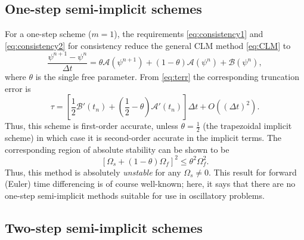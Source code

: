 \documentclass[12pt]{article}
\newcommand{\dt}{\Delta t}
\newcommand{\opA}{\mathcal{A}}
\newcommand{\opB}{\mathcal{B}}
\begin{document}
\pagebreak[3]
\subsection{One-step semi-implicit schemes}

For a one-step scheme ($m=1$), the requirements \eqref{eq:consistency1} and 
\eqref{eq:consistency2} for consistency reduce the general CLM method 
\eqref{eq:CLM} to
\begin{equation}
  \frac{\psi^{n+1}-\psi^{n}}{\dt} =
    \theta \opA(\psi^{n+1}) + (1-\theta) \opA(\psi^{n}) + \opB(\psi^{n}) ,
\end{equation}
where $\theta$ is the single free parameter.  
From \eqref{eq:terr} the corresponding truncation error is
\begin{equation}
  \tau = \left[\frac12 \opB'(t_n) 
       + \left(\frac12-\theta\right)\opA'(t_n)\right]\dt
       + O\left((\dt)^2\right) .
\end{equation}
Thus, this scheme is first-order accurate, unless $\theta=\frac12$ 
(the trapezoidal implicit scheme) in which case it is second-order accurate in
the implicit terms.  
The corresponding region of absolute stability can be shown to be
\begin{equation}
  \left[\Omega_s + (1-\theta)\Omega_f\right]^2 \le \theta^2\Omega_f^2 .
\end{equation}
Thus, this method is absolutely \emph{unstable} for any $\Omega_s\ne0$.  This
result for forward (Euler) time differencing is of course well-known; here,
it says that there are no one-step semi-implicit methods suitable for use in
oscillatory problems. 

\pagebreak[3]
\subsection{Two-step semi-implicit schemes}
\end{document}
